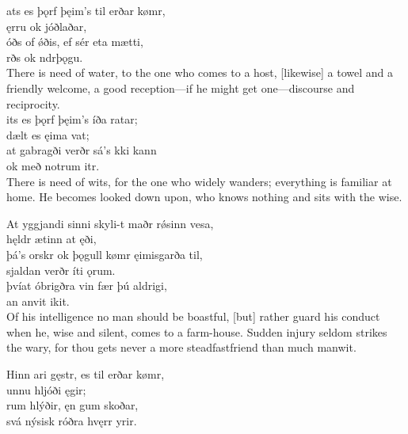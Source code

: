 \bva {}ats es þǫrf \hld þęim's til erðar kømr, \\%
\ind {}ęrru ok jóðlaðar, \\%
óðs of ǿðis, \hld ef sér eta mætti, \\%
\ind {}rðs ok ndrþǫgu.\\%

\bvb There is need of water, to the one who comes to a host, [likewise] a towel and a friendly welcome, a good reception—if he might get one—discourse and reciprocity. \\

\bva {}its es þǫrf \hld þęim's íða ratar; \\%
\ind dælt es ęima vat; \\%
at gabragði \hld verðr sá's kki kann \\%
\ind ok með notrum itr.\\%

\bvb There is need of wits, for the one who widely wanders; everything is familiar at home. He becomes looked down upon\footnotemark[8], who knows nothing and sits with the wise. \\

\bva At yggjandi sinni \hld skyli-t maðr rǿsinn vesa, \\%
\ind hęldr ætinn at ęði, \\%
þá's orskr ok þǫgull \hld kømr ęimisgarða til, \\%
\ind sjaldan verðr íti ǫrum. \\%
þvíat óbrigðra vin \hld fær þú aldrigi, \\%
\ind an anvit ikit.\\%

\bvb Of his intelligence no man should be boastful, [but] rather guard his conduct when he, wise and silent, comes to a farm-house. Sudden injury seldom strikes the wary, for thou gets never a more steadfast\footnotemark[10] friend than much manwit. \\

\bva Hinn ari gęstr, \hld es til erðar kømr, \\%
\ind {}unnu hljóði ęgir; \\%
rum hlýðir, \hld ęn gum skoðar, \\%
\ind svá nýsisk róðra hvęrr yrir.\\%

